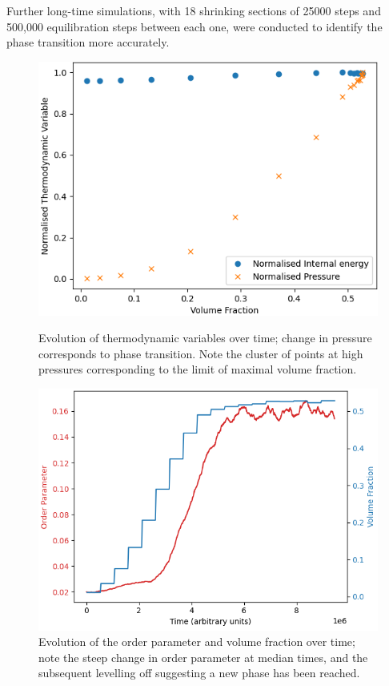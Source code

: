 \documentclass[11pt, a4paper]{article} %
\begin{document}
Further long-time simulations, with 18 shrinking sections of 25000 steps and 500,000 equilibration steps between each one, were conducted to identify the phase transition more accurately. 

\begin{figure}[ht]
	\centering
	\begin{minipage}[b]{0.45\textwidth}
		\includegraphics[width=\linewidth]{Figures/phaseplot_frac_oblong}  
		\caption{Evolution of thermodynamic variables over time; change in pressure corresponds to phase transition. Note the cluster of points at high pressures corresponding to the limit of maximal volume fraction.}
		\label{fig:oblong_pressure_phase}
	\end{minipage}
	\hfill
	\begin{minipage}[b]{0.45\textwidth}
		\includegraphics[width=\linewidth]{Figures/order_and_volfrac_oblong}  
		\caption{Evolution of the order parameter and volume fraction over time; note the steep change in order parameter at median times, and the subsequent levelling off suggesting  a new phase has been reached.}
		\label{fig:oblong_order_evo}
	\end{minipage}
\end{figure}
\end{document}
